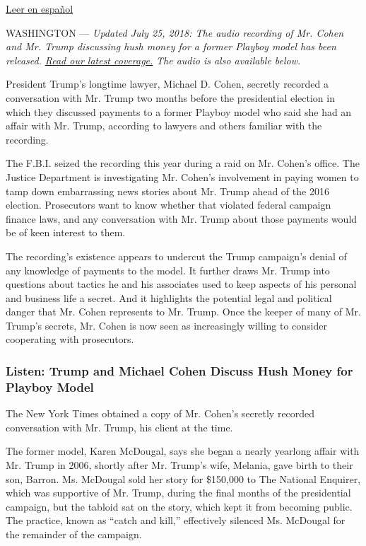 \href{https://www.nytimes3xbfgragh.onion/es/2018/07/20/trump-cohen-abogado-grabado-secreto-playboy}{Leer
en español}

WASHINGTON --- \emph{Updated July 25, 2018: The audio recording of Mr.
Cohen and Mr. Trump discussing hush money for a former Playboy model has
been released.}
\href{https://www.nytimes3xbfgragh.onion/2018/07/25/us/politics/trump-michael-cohen-recording.html}{\emph{Read
our latest coverage.}} \emph{The audio is also available below.}

President Trump's longtime lawyer, Michael D. Cohen, secretly recorded a
conversation with Mr. Trump two months before the presidential election
in which they discussed payments to a former Playboy model who said she
had an affair with Mr. Trump, according to lawyers and others familiar
with the recording.

The F.B.I. seized the recording this year during a raid on Mr. Cohen's
office. The Justice Department is investigating Mr. Cohen's involvement
in paying women to tamp down embarrassing news stories about Mr. Trump
ahead of the 2016 election. Prosecutors want to know whether that
violated federal campaign finance laws, and any conversation with Mr.
Trump about those payments would be of keen interest to them.

The recording's existence appears to undercut the Trump campaign's
denial of any knowledge of payments to the model. It further draws Mr.
Trump into questions about tactics he and his associates used to keep
aspects of his personal and business life a secret. And it highlights
the potential legal and political danger that Mr. Cohen represents to
Mr. Trump. Once the keeper of many of Mr. Trump's secrets, Mr. Cohen is
now seen as increasingly willing to consider cooperating with
prosecutors.

\hypertarget{listen-trump-and-michael-cohen-discuss-hush-money-for-playboy-model}{%
\subsubsection{Listen: Trump and Michael Cohen Discuss Hush Money for
Playboy
Model}\label{listen-trump-and-michael-cohen-discuss-hush-money-for-playboy-model}}

The New York Times obtained a copy of Mr. Cohen's secretly recorded
conversation with Mr. Trump, his client at the time.

The former model, Karen McDougal, says she began a nearly yearlong
affair with Mr. Trump in 2006, shortly after Mr. Trump's wife, Melania,
gave birth to their son, Barron. Ms. McDougal sold her story for
\$150,000 to The National Enquirer, which was supportive of Mr. Trump,
during the final months of the presidential campaign, but the tabloid
sat on the story, which kept it from becoming public. The practice,
known as ``catch and kill,'' effectively silenced Ms. McDougal for the
remainder of the campaign.

